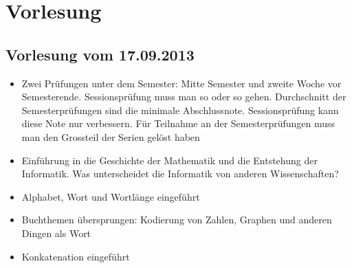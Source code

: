 \chapter{Vorlesung}
\section{Vorlesung vom 17.09.2013}
\begin{itemize}
  \item Zwei Prüfungen unter dem Semester: Mitte Semester und zweite Woche vor Semesterende. Sessionsprüfung muss man so oder so gehen. Durchschnitt der Semesterprüfungen sind die minimale Abschlussnote. Sessionsprüfung kann diese Note nur verbessern. Für Teilnahme an der Semesterprüfungen muss man den Grossteil der Serien gelöst haben
  \item Einführung in die Geschichte der Mathematik und die Entstehung der Informatik. Was unterscheidet die Informatik von anderen Wissenschaften?
  \item Alphabet, Wort und Wortlänge eingeführt
  \item Buchthemen übersprungen: Kodierung von Zahlen, Graphen und anderen Dingen als Wort
  \item Konkatenation eingeführt
\end{itemize}
